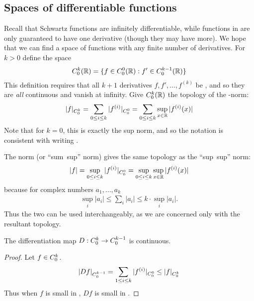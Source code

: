     \subsection{Spaces of differentiable functions}
      Recall that Schwartz functions are infinitely differentiable, while functions in \Coo are only guaranteed to have one derivative (though they may have more).
      We hope that we can find a space of functions with any finite number of derivatives. 
      For $k>0$ define the space 
      \begin{align*}
        {C^k_0}(\mathbb{R}) = \{f\in {C^0_0}(\mathbb{R}) : f'\in {C^{k-1}_0}(\mathbb{R})\}
      \end{align*}
      This definition requires that all $k+1$ derivatives $f,f',\ldots,f^{(k)}$ be \Coo, and so they are \emph{all} continuous and vanish at infinity.
      Give ${C^k_0}(\mathbb{R})$ the topology of the \Cko-norm:
      \begin{align*}
        |f|_{C^k_0} = \sum_{0\le i\le k} |f^{(i)}|_{C^0_0} = \sum_{0\le i\le k} \sup_{x\in\mathbb{R}}|f^{(i)}(x)|
      \end{align*}
      Note that for $k=0$, this is exactly the sup norm, and so the notation \Cko is consistent with writing \Coo.
      \begin{rmk}
        The \Cko norm (or ``sum~sup'' norm) gives the same topology as the ``sup~sup'' norm:
        \begin{align*}
          |f|=\sup_{0\le i\le k}|f^{(i)}|_{C^0_0}=\sup_{0\le i\le k}\sup_{x\in\mathbb{R}}|f^{(i)}(x)|
        \end{align*}
        because for complex numbers $a_1,\ldots,a_k$
        \begin{align*}
          \sup_i |a_i| \le \sum_i |a_i| \le k\cdot\sup_i |a_i|\text{.}
        \end{align*}
        Thus the two can be used interchangeably, as we are concerned only with the resultant topology.
      \end{rmk}
      \begin{claim}
        \label{claim:diffcontCk0}
        The differentiation map $D:{C^k_0}\rightarrow{C^{k-1}_0}$ is continuous.
        \begin{proof}
          Let $f\in {C^k_0}$.
          \begin{align*}
            |Df|_{C^{k-1}_0}
            = \sum_{1\le i\le k} |f^{(i)}|_{C^0_0}
            \le |f|_{C^k_0}
          \end{align*}
          Thus when $f$ is small in \Cko, $Df$ is small in \Ckmo.
        \end{proof}
      \end{claim}
